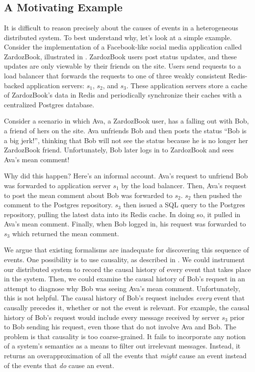 \section{\WatProvenance{}}

\subsection{A Motivating Example}
\newcommand{\systemname}{ZardozBook}
It is difficult to reason precisely about the causes of events in a
heterogeneous distributed system. To best understand why, let's look at a
simple example. Consider the implementation of a Facebook-like social media
application called \systemname{}, illustrated in .
\systemname{} users post status updates, and these updates are only viewable by
their friends on the site. Users send requests to a load balancer that forwards
the requests to one of three weakly consistent Redis-backed application
servers: $s_1$, $s_2$, and $s_3$. These application servers store a cache of
\systemname{}'s data in Redis and periodically synchronize their caches with a
centralized Postgres database.

Consider a scenario in which Ava, a \systemname{} user, has a falling out with
Bob, a friend of hers on the site. Ava unfriends Bob and then posts the status
``Bob is a big jerk!'', thinking that Bob will not see the status
because he is no longer her \systemname{} friend. Unfortunately, Bob later logs
in to \systemname{} and sees Ava's mean comment!

{}

Why did this happen? Here's an informal account. Ava's request to unfriend Bob
was forwarded to application server $s_1$ by the load balancer. Then, Ava's
request to post the mean comment about Bob was forwarded to $s_2$. $s_2$ then
pushed the comment to the Postgres repository. $s_3$ then issued a SQL query
to the Postgres repository, pulling the latest data into its Redis cache. In
doing so, it pulled in Ava's mean comment. Finally, when Bob logged in, his
request was forwarded to $s_3$ which returned the mean comment.

We argue that existing formalisms are inadequate for discovering this
sequence of events. One possibility is to use causality, as described in
. We could instrument our distributed system to record the
causal history of every event that takes place in the system. Then, we could
examine the causal history of Bob's request in an attempt to diagnose why Bob
was seeing Ava's mean comment. Unfortunately, this is not helpful. The causal
history of Bob's request includes \emph{every} event that causally precedes it,
whether or not the event is relevant. For example, the causal history
of Bob's request would include every message received by server $s_3$ prior to
Bob sending his request, even those that do not involve Ava and Bob. The
problem is that causality is too coarse-grained. It fails to incorporate any
notion of a system's semantics as a means to filter out irrelevant messages.
Instead, it returns an overapproximation of all the events that \emph{might}
cause an event instead of the events that \emph{do} cause an event.

